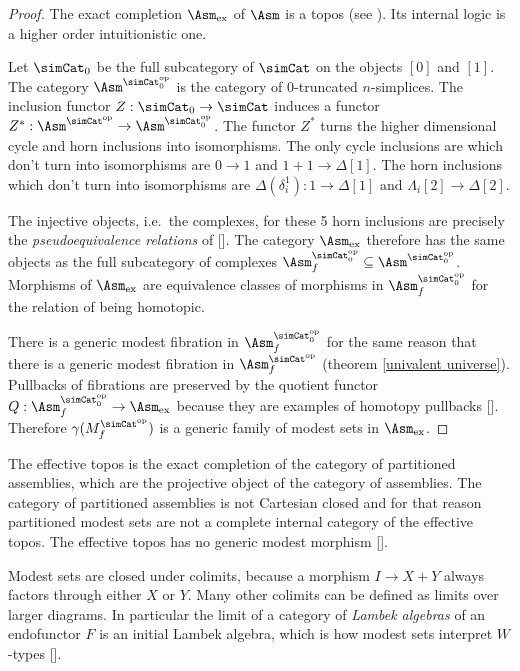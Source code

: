 \documentclass{tac}
\newcommand\ri{^*}
\newcommand\dual{^{\mathrm{op}}}
\newcommand\s{^{\simCat\dual}}
\newcommand\of{:}
\newcommand\f{_f}
\newcommand\gen\gamma
\newcommand\ex{_{\textrm{ex}}}
\newcommand\citep[1]{[\cite{#1}]}
\begin{document}
\begin{proof} The exact completion $\Asm\ex$ of $\Asm$ is a topos (see \cite{MR1981211}). Its internal logic is a higher order intuitionistic one. 

Let $\simCat_0$ be the full subcategory of $\simCat$ on the objects $[0]$ and $[1]$. The category $\Asm^{\simCat_0\dual}$ is the category of $0$-truncated $n$-simplices. The inclusion functor $Z\of \simCat_0\to\simCat$ induces a functor $Z\ri\of \Asm\s \to \Asm^{\simCat_0\dual}$. The functor $Z\ri$ turns the higher dimensional cycle and horn inclusions into isomorphisms. The only cycle inclusions are which don't turn into isomorphisms are $0\to 1$ and $1+1 \to \Delta[1]$. The horn inclusions which don't turn into isomorphisms are $\Delta(\delta^1_i)\of 1\to \Delta[1]$ and $\Lambda_i[2] \to \Delta[2]$.

The injective objects, i.e.\ the complexes, for these 5 horn inclusions are precisely the \emph{pseudoequivalence relations} of \citep{MR1600009}. The category $\Asm\ex$ therefore has the same objects as the full subcategory of complexes $\Asm^{\simCat_0\dual}\f\subseteq \Asm^{\simCat_0\dual}$. Morphisms of $\Asm\ex$ are equivalence classes of morphisms in $\Asm^{\simCat_0\dual}\f$ for the relation of being homotopic. 

There is a generic modest fibration in $\Asm^{\simCat_0\dual}\f$ for the same reason that there is a generic modest fibration in $\Asm\s\f$ (theorem \ref{univalent universe}). Pullbacks of fibrations are preserved by the quotient functor $Q\of \Asm^{\simCat_0\dual}\f \to\Asm\ex$ because they are examples of homotopy pullbacks \citep{GJSHT}. Therefore $\gen(M\s\f)$ is a generic family of modest sets in $\Asm\ex$.
\end{proof}

\begin{remark} The effective topos is the exact completion of the category of partitioned assemblies, which are the projective object of the category of assemblies. The category of partitioned assemblies is not Cartesian closed and for that reason partitioned modest sets are not a complete internal category of the effective topos. The effective topos has no generic modest morphism \citep{MR1023803}.
\end{remark}

\begin{remark}[Colimits] Modest sets are closed under colimits, because a morphism $I\to X+Y$ always factors through either $X$ or $Y$. Many other colimits can be defined as limits over larger diagrams. In particular the limit of a category of \emph{Lambek algebras} of an endofunctor $F$ is an initial Lambek algebra, which is how modest sets interpret $W$-types \citep{Freyd91}.
\end{remark}
\end{document}
